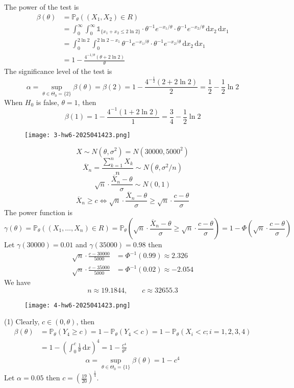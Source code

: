 The power of the test is
\[
\begin{aligned}
\beta(\theta) & =\mathbb{P}_{\theta}((X_1,X_2)\in R) \\
 & =\int_{0}^{\infty} \int_{0}^{\infty} \mathbb{1}_{\{ x_1+x_2\leq 2\ln2 \}}\cdot \theta ^{-1}e^{ -x_1/\theta }\cdot\theta ^{-1}e^{ -x_2/\theta } \, \mathrm{d}x_2 \, \mathrm{d}x_1 \\
 & =\int_{0}^{2\ln2} \int_{0}^{2\ln2-x_1}  \theta ^{-1}e^{ -x_1/\theta }\cdot\theta ^{-1}e^{ -x_2/\theta } \, \mathrm{d}x_2  \, \mathrm{d}x_1 \\
 & =1-\frac{4^{-1/\theta } (\theta +2\ln 2)}{\theta } 
\end{aligned} 
\]
The significance level of the test is
\[
\alpha=\sup_{\theta\in\Theta_0=\{ 2 \}}\beta(\theta)=\beta(2)=1-\frac{4^{-\frac{1}{2}}(2+2\ln2)}{2}=\frac{1}{2}-\frac{1}{2}\ln2
\]
When $H_0$ is false, $\theta=1$, then
\[
\beta(1)=1-\frac{4^{-1}(1+2\ln2)}{1}=\frac{3}{4}-\frac{1}{2}\ln2
\]
\begin{exercise}
\begin{figure}[H]
\centering
\texttt{[image: 3-hw6-2025041423.png]}
\label{}
\end{figure}
\end{exercise}
\[
X\sim N(\theta,\sigma^{2})=N(30000,5000^2)
\]
\[
\overline{X}_n=\frac{\sum_{k=1}^{n} X_k}{n}\sim N(\theta,\sigma^{2}/n)
\]
\[
\sqrt{ n }\cdot\frac{\overline{X}_n-\theta}{\sigma}\sim N(0,1)
\]
\[
\overline{X}_n\geq c\iff \sqrt{ n }\cdot\frac{\overline{X}_n-\theta}{\sigma}\geq \sqrt{ n }\cdot\frac{c-\theta}{\sigma}
\]
The power function is
\[
\gamma(\theta)=\mathbb{P}_{\theta}((X_1,\dots,X_n)\in R)=\mathbb{P}_{\theta}\left( \sqrt{ n }\cdot\frac{\overline{X}_n-\theta}{\sigma}\geq \sqrt{ n }\cdot\frac{c-\theta}{\sigma} \right)=1-\Phi\left( \sqrt{ n }\cdot\frac{c-\theta}{\sigma} \right)
\]
Let $\gamma(30000)=0.01$ and $\gamma(35000)=0.98$ then
\[
\begin{aligned}
\sqrt{ n }\cdot\frac{c-30000}{5000} & =\Phi ^{-1}(0.99)\approx 2.326\\
\sqrt{ n }\cdot\frac{c-35000}{5000} & =\Phi ^{-1}(0.02)\approx-2.054
\end{aligned}
\]
We have
\[
n\approx19.1844,\qquad c \approx32655.3
\]
\begin{exercise}
\begin{figure}[H]
\centering
\texttt{[image: 4-hw6-2025041423.png]}
\label{}
\end{figure}
\end{exercise}
(1) Clearly, $c\in(0,\theta)$, then
\[
\begin{aligned}
\beta(\theta) & =\mathbb{P}_{\theta}(Y_4\geq c)=1-\mathbb{P}_{\theta}(Y_4<c)=1-\mathbb{P}_{\theta}(X_i<c;i=1,2,3,4) \\
 & =1-\left( \int_{0}^{c}  \frac{1}{\theta } \, \mathrm{d}x  \right)^{4}=1-\frac{c^{4}}{\theta^{4}}
\end{aligned}
\]
\[
\alpha=\sup_{\theta\in\Theta_0=\{ 1 \}}\beta(\theta)=1-c^{4}
\]
Let $\alpha=0.05$ then $c=\left( \frac{19}{20} \right)^{\frac{1}{4}}$.

